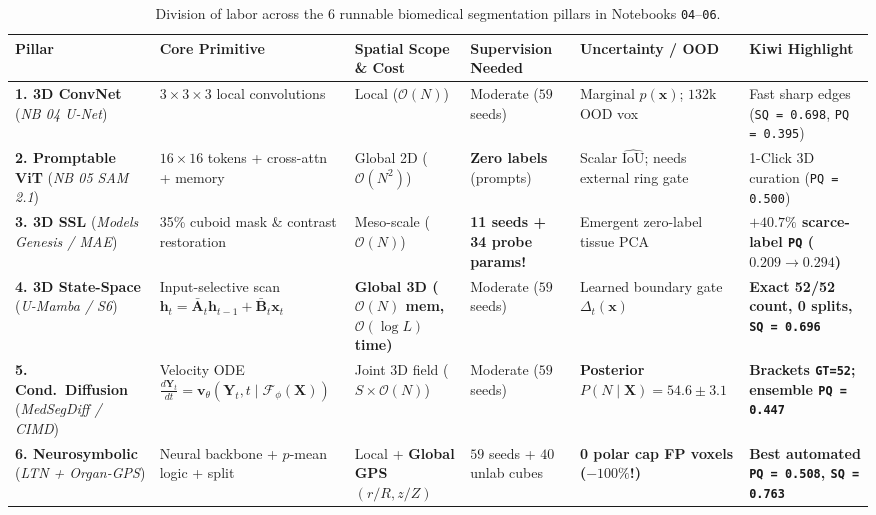 \documentclass[10.5pt,a4paper]{article}
\begin{document}
\begin{table}[H]
\centering
\scriptsize
\renewcommand{\arraystretch}{1.22}
\begin{tabularx}{\textwidth}{L{2.25cm} Y Y Y Y Y}
\toprule
{}
\textbf{Pillar} & \textbf{Core Primitive} & \textbf{Spatial Scope \& Cost} & \textbf{Supervision Needed} & \textbf{Uncertainty / OOD} & \textbf{Kiwi Highlight} \\
\midrule
\textbf{1. 3D ConvNet} (\emph{NB 04 U-Net}) & $3\times 3\times 3$ local convolutions & Local ($\mathcal{O}(N)$) & Moderate ($59$ seeds) & Marginal $p(\mathbf{x})$; $132\text{k}$ OOD vox & Fast sharp edges (\texttt{SQ = 0.698}, \texttt{PQ = 0.395}) \\
\textbf{2. Promptable ViT} (\emph{NB 05 SAM 2.1}) & $16\times 16$ tokens + cross-attn + memory & Global 2D ($\mathcal{O}(N^2)$) & \textbf{Zero labels} (prompts) & Scalar $\widehat{\text{IoU}}$; needs external ring gate & 1-Click 3D curation (\texttt{PQ = 0.500}) \\
\textbf{3. 3D SSL} (\emph{Models Genesis / MAE}) & 35\% cuboid mask \& contrast restoration & Meso-scale ($\mathcal{O}(N)$) & \textbf{11 seeds + 34 probe params!} & Emergent zero-label tissue PCA & \textbf{$+40.7\%$ scarce-label \texttt{PQ} ($\mathbf{0.209 \rightarrow 0.294}$)} \\
\textbf{4. 3D State-Space} (\emph{U-Mamba / S6}) & Input-selective scan $\mathbf{h}_t = \bar{\mathbf{A}}_t\mathbf{h}_{t-1} + \bar{\mathbf{B}}_t\mathbf{x}_t$ & \textbf{Global 3D ($\mathcal{O}(N)$ mem, $\mathcal{O}(\log L)$ time)} & Moderate ($59$ seeds) & Learned boundary gate $\Delta_t(\mathbf{x})$ & \textbf{Exact 52/52 count, 0 splits, \texttt{SQ = 0.696}} \\
\textbf{5. Cond.\ Diffusion} (\emph{MedSegDiff / CIMD}) & Velocity ODE $\frac{d\mathbf{Y}_t}{dt} = \mathbf{v}_\theta(\mathbf{Y}_t, t \mid \mathcal{F}_\phi(\mathbf{X}))$ & Joint 3D field ($S \times \mathcal{O}(N)$) & Moderate ($59$ seeds) & \textbf{Posterior $P(N\mid\mathbf{X}) = 54.6 \pm 3.1$} & \textbf{Brackets \texttt{GT=52}; ensemble \texttt{PQ = 0.447}} \\
\textbf{6. Neurosymbolic} (\emph{LTN + Organ-GPS}) & Neural backbone + $p$-mean logic + split & Local + \textbf{Global GPS $(r/R, z/Z)$} & $59$ seeds + $40$ unlab cubes & \textbf{0 polar cap FP voxels ($-100\%$!)} & \textbf{Best automated \texttt{PQ = 0.508}, \texttt{SQ = 0.763}} \\
\bottomrule
\end{tabularx}
\caption{Division of labor across the 6 runnable biomedical segmentation pillars in Notebooks \texttt{04}--\texttt{06}.}
\end{table}
\end{document}
